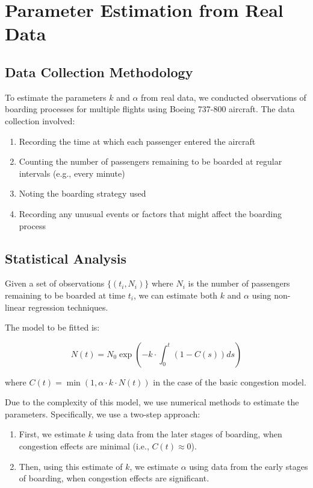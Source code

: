 \documentclass[12pt,a4paper]{article}
\begin{document}
\section{Parameter Estimation from Real Data}

\subsection{Data Collection Methodology}

To estimate the parameters $k$ and $\alpha$ from real data, we conducted observations of boarding processes for multiple flights using Boeing 737-800 aircraft. The data collection involved:

\begin{enumerate}
    \item Recording the time at which each passenger entered the aircraft
    \item Counting the number of passengers remaining to be boarded at regular intervals (e.g., every minute)
    \item Noting the boarding strategy used
    \item Recording any unusual events or factors that might affect the boarding process
\end{enumerate}

\subsection{Statistical Analysis}

Given a set of observations $\{(t_i, N_i)\}$ where $N_i$ is the number of passengers remaining to be boarded at time $t_i$, we can estimate both $k$ and $\alpha$ using non-linear regression techniques.

The model to be fitted is:

\begin{equation}
N(t) = N_0 \exp\left(-k \cdot \int_0^t (1 - C(s)) ds\right)
\end{equation}

where $C(t) = \min(1, \alpha \cdot k \cdot N(t))$ in the case of the basic congestion model.

Due to the complexity of this model, we use numerical methods to estimate the parameters. Specifically, we use a two-step approach:

\begin{enumerate}
    \item First, we estimate $k$ using data from the later stages of boarding, when congestion effects are minimal (i.e., $C(t) \approx 0$).
    \item Then, using this estimate of $k$, we estimate $\alpha$ using data from the early stages of boarding, when congestion effects are significant.
\end{enumerate}
\end{document}
